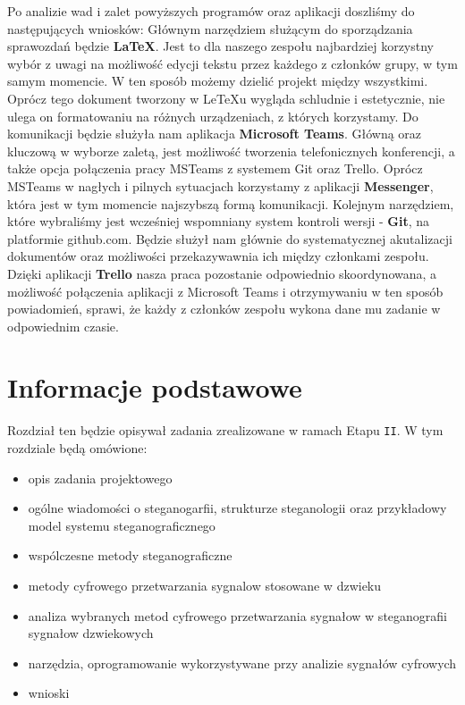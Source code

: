 \documentclass[a4paper,titleauthor]{mwart}
\begin{document}
Po analizie wad i zalet powyższych programów oraz aplikacji doszliśmy do następujących wniosków: \newline
Głównym narzędziem służącym do sporządzania sprawozdań będzie \textbf{LaTeX}. Jest to dla naszego zespołu najbardziej korzystny wybór z uwagi na możliwość edycji tekstu przez każdego z członków grupy, w tym samym momencie. W ten sposób możemy dzielić projekt między wszystkimi. Oprócz tego dokument tworzony w LeTeXu wygląda schludnie i estetycznie, nie ulega on formatowaniu na różnych urządzeniach, z których korzystamy. 
Do komunikacji będzie służyła nam aplikacja \textbf{Microsoft Teams}. Główną oraz kluczową w wyborze zaletą, jest możliwość tworzenia telefonicznych konferencji, a także opcja połączenia pracy MSTeams z systemem Git oraz Trello.
Oprócz MSTeams w nagłych i pilnych sytuacjach korzystamy z aplikacji \textbf{Messenger}, która jest w tym momencie najszybszą formą komunikacji. 
Kolejnym narzędziem, które wybraliśmy jest wcześniej wspomniany system kontroli wersji - \textbf{Git}, na platformie github.com.
Będzie służył nam głównie do systematycznej akutalizacji dokumentów oraz możliwości przekazywawnia ich między członkami zespołu. 
Dzięki aplikacji \textbf{Trello} nasza praca pozostanie odpowiednio skoordynowana, a możliwość połączenia aplikacji z Microsoft Teams i otrzymywaniu w ten sposób powiadomień, sprawi, że każdy z członków zespołu wykona dane mu zadanie w odpowiednim czasie. 

\section{Informacje podstawowe}
\label{sec:informacje_podstawowe} 
Rozdział ten będzie opisywał zadania zrealizowane w ramach Etapu \texttt{II}. W tym rozdziale będą omówione:\newline 
\begin{itemize}
	\item opis zadania projektowego 
	\item ogólne wiadomości o steganogarfii, strukturze steganologii oraz przykładowy model systemu steganograficznego
	\item wspólczesne metody steganograficzne
	\item metody cyfrowego przetwarzania sygnalow stosowane w dzwieku
	\item analiza wybranych metod cyfrowego przetwarzania sygnałow w steganografii sygnałow dzwiekowych
	\item narzędzia, oprogramowanie wykorzystywane przy analizie sygnałów cyfrowych
	\item wnioski
	\end{itemize} 
\end{document}
